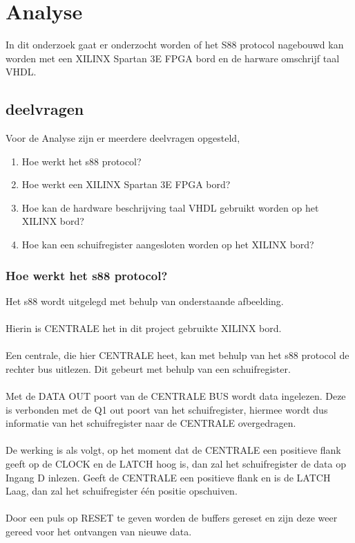 \chapter{Analyse}
In dit onderzoek gaat er onderzocht worden of het S88 protocol nagebouwd kan worden met een XILINX Spartan 3E FPGA bord en de harware omschrijf taal VHDL.
\section{deelvragen}
Voor de Analyse zijn er meerdere deelvragen opgesteld,

\begin{enumerate}
	\item Hoe werkt het s88 protocol?
	\item Hoe werkt een XILINX Spartan 3E FPGA bord?
	\item Hoe kan de hardware beschrijving taal VHDL gebruikt worden op het XILINX bord?
	\item Hoe kan een schuifregister aangesloten worden op het XILINX bord?
\end{enumerate}

\subsection{Hoe werkt het s88 protocol?}
Het s88 wordt uitgelegd met behulp van onderstaande afbeelding.
\\\\
Hierin is CENTRALE het in dit project gebruikte XILINX bord. 
\\\\
Een centrale, die hier CENTRALE heet, kan met behulp van het s88 protocol de rechter bus uitlezen. Dit gebeurt met behulp van een schuifregister.
\\\\
Met de DATA OUT poort van de CENTRALE BUS wordt data ingelezen. Deze is verbonden met de Q1 out poort van het schuifregister, hiermee wordt dus informatie van het schuifregister naar de CENTRALE overgedragen.
\\\\
De werking is als volgt, op het moment dat de CENTRALE een positieve flank geeft op de CLOCK en de LATCH hoog is, dan zal het schuifregister de data op Ingang D inlezen. Geeft de CENTRALE een positieve flank en is de LATCH Laag, dan zal het schuifregister één positie opschuiven.
\\\\
Door een puls op RESET te geven worden de buffers gereset en zijn deze weer gereed voor het ontvangen van nieuwe data. 


